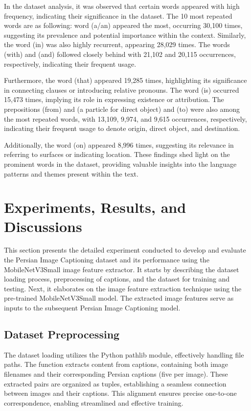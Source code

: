 \documentclass[runningheads]{llncs}
\begin{document}
In the dataset analysis, it was observed that certain words appeared with high frequency, indicating their significance in the dataset. The 10 most repeated words are as following: word (a/an) appeared the most, occurring 30,100 times, suggesting its prevalence and potential importance within the context. Similarly, the word (in) was also highly recurrent, appearing 28,029 times. The words (with) and (and) followed closely behind with 21,102 and 20,115 occurrences, respectively, indicating their frequent usage.

Furthermore, the word (that) appeared 19,285 times, highlighting its significance in connecting clauses or introducing relative pronouns. The word (is) occurred 15,473 times, implying its role in expressing existence or attribution. The prepositions (from) and (a particle for direct object) and (to) were also among the most repeated words, with 13,109, 9,974, and 9,615 occurrences, respectively, indicating their frequent usage to denote origin, direct object, and destination.

Additionally, the word (on) appeared 8,996 times, suggesting its relevance in referring to surfaces or indicating location. These findings shed light on the prominent words in the dataset, providing valuable insights into the language patterns and themes present within the text.

\section{Experiments, Results, and Discussions}

This section presents the detailed experiment conducted to develop and evaluate the Persian Image Captioning dataset and its performance using the MobileNetV3Small image feature extractor. It starts by describing the dataset loading process, preprocessing of captions, and the dataset for training and testing. Next, it elaborates on the image feature extraction technique using the pre-trained MobileNetV3Small model. The extracted image features serve as inputs to the subsequent Persian Image Captioning model.

\subsection{Dataset Preprocessing}
The dataset loading utilizes the Python pathlib module, effectively handling file paths. The function extracts content from captions, containing both image filenames and their corresponding Persian captions (five per image). These extracted pairs are organized as tuples, establishing a seamless connection between images and their captions. This alignment ensures precise one-to-one correspondence, enabling streamlined and effective training.
\end{document}
